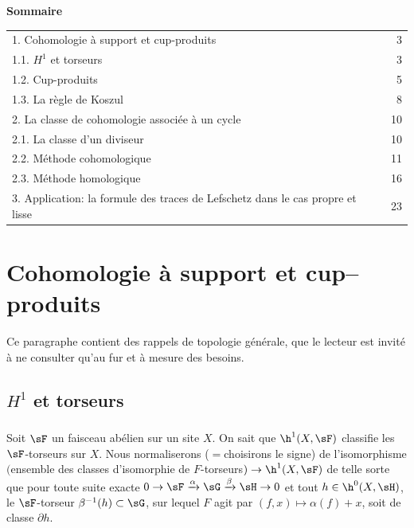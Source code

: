 \begin{center}\textbf{Sommaire}\end{center}
\begin{tabular}{p{}r}
1. Cohomologie à support et cup-produits & 3\\
1.1. $H^1$ et torseurs & 3\\
1.2. Cup-produits & 5\\
1.3. La règle de Koszul & 8\\
2. La classe de cohomologie associée à un cycle & 10\\
2.1. La classe d'un diviseur & 10\\
2.2. Méthode cohomologique & 11\\
2.3. Méthode homologique & 16\\
3. Application: la formule des traces de Lefschetz dans le cas propre et lisse & 23
\end{tabular}

\section{Cohomologie à support et cup--produits}\label{IV:1}

Ce paragraphe contient des rappels de topologie générale, que le 
lecteur est invité à ne consulter qu'au fur et à mesure des besoins.










\subsection{\texorpdfstring{$H^1$}{H1} et torseurs}\label{IV:1-1}





\subsubsection{}\label{IV:1-1-1}

Soit $\sF$ un faisceau abélien sur un site $X$. On sait que $\h^1(X,\sF)$ 
classifie les $\sF$-torseurs sur $X$. Nous normaliserons ($=$choisirons le 
signe) de l'isomorphisme $($ensemble des classes d'isomorphie de 
$F$-torseurs$)\to \h^1(X,\sF)$ de telle sorte que pour toute suite exacte 
$0\to \sF\xrightarrow\alpha\sG\xrightarrow\beta\sH\to 0$ et tout 
$h\in\h^0(X,\sH)$, le $\sF$-torseur $\beta^{-1}(h)\subset \sG$, sur lequel 
$F$ agit par $(f,x)\mapsto \alpha(f)+x$, soit de classe $\partial h$. 





